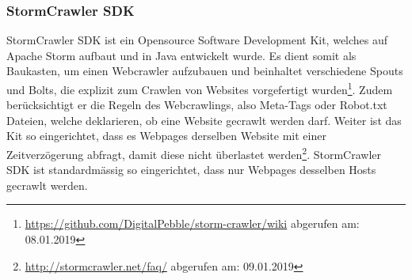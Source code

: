 \subsubsection{StormCrawler SDK}
StormCrawler SDK ist ein Opensource Software Development Kit, welches auf Apache Storm aufbaut und in Java entwickelt wurde.
Es dient somit als Baukasten, um einen Webcrawler aufzubauen und beinhaltet verschiedene Spouts und Bolts, die explizit zum Crawlen von Websites vorgefertigt wurden\footnote{\url{https://github.com/DigitalPebble/storm-crawler/wiki} abgerufen am: 08.01.2019}.
Zudem berücksichtigt er die Regeln des Webcrawlings, also Meta-Tags oder Robot.txt Dateien, welche deklarieren, ob eine Website gecrawlt werden darf.
Weiter ist das Kit so eingerichtet, dass es Webpages derselben Website mit einer Zeitverzögerung abfragt, damit diese nicht überlastet werden\footnote{\url{http://stormcrawler.net/faq/} abgerufen am: 09.01.2019}.
StormCrawler SDK ist standardmässig so eingerichtet, dass nur Webpages desselben Hosts gecrawlt werden.
